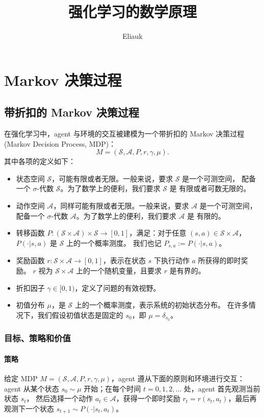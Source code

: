 \documentclass[fontset=none,zihao=-4]{Notes}
\title{\sffamily 强化学习的数学原理}
\author{Eliauk}
\begin{document}
\maketitle

\tableofcontents

\section{Markov 决策过程}

\subsection{带折扣的 Markov 决策过程}

在强化学习中，agent 与环境的交互被建模为一个带折扣的 Markov 决策过程
(Markov Decision Process, MDP)：
\[
  M=(\mathcal S, \mathcal A,  P, r, \gamma,\mu).
\]
其中各项的定义如下：
\begin{itemize}
  \item 状态空间 $\mathcal S$，可能有限或者无限。一般来说，要求 $\mathcal S$ 是一个可测空间，
  配备一个 $\sigma$-代数 $\mathscr{S}$。为了数学上的便利，我们要求 $\mathcal S$ 是
  有限或者可数无限的。
  \item 动作空间 $\mathcal A$，同样可能有限或者无限。一般来说，要求 $\mathcal A$ 是一个可测空间，
  配备一个 $\sigma$-代数 $\mathscr{A}$。为了数学上的便利，我们要求 $\mathcal A$ 是
  有限的。
  \item 转移函数 $P:(\mathcal S\times \mathcal A)\times \mathscr{S}\to [0,1]$，满足：对于任意 $(s,a)\in \mathcal S\times \mathcal A$，$P(\cdot | s,a)$ 是 $\mathcal S$ 上的一个概率测度。
  我们也记 $P_{s,a} := P(\cdot | s,a)$。
  \item 奖励函数 $r: \mathcal S \times \mathcal A \to [0,1]$，表示在状态 $s$ 下执行动作 $a$ 所获得的即时奖励。
  $r$ 视为 $\mathcal S \times \mathcal A$ 上的一个随机变量，且要求 $r$ 是有界的。
  \item 折扣因子 $\gamma\in [0,1)$，定义了问题的有效视野。
  \item 初值分布 $\mu$，是 $\mathcal S$ 上的一个概率测度，表示系统的初始状态分布。
在许多情况下，我们假设初值状态是固定的 $s_0$，即 $\mu = \delta_{s_0}$。
\end{itemize}

\subsubsection{目标、策略和价值}

\paragraph{策略} 给定 MDP $M=(\mathcal S, \mathcal A,  P, r, \gamma,\mu)$，agent 遵从下面的原则和环境进行交互：
agent 从某个状态 $s_0\sim \mu$ 开始；在每个时间 $t=0,1,2,\dots$ 处，agent 首先观测当前状态 $s_t$，
然后选择一个动作 $a_t\in \mathcal A$，获得一个即时奖励 $r_t=r(s_t,a_t)$，最后再观测下一个状态 
$s_{t+1}\sim P(\cdot|s_t,a_t)$。
\end{document}
